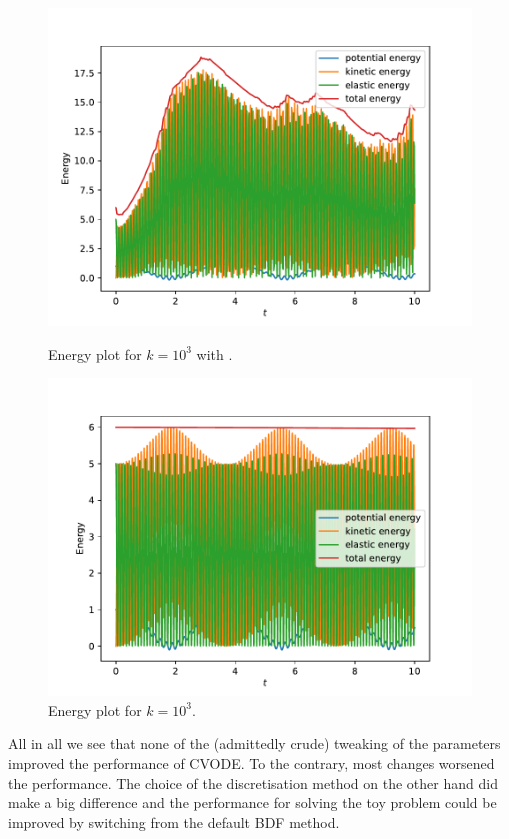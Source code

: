 \documentclass{report}
\begin{document}
\begin{figure}[h]
\centering
\begin{minipage}[b]{0.45\textwidth}
\centering
\includegraphics[width=\textwidth]{../Plots/Task4/Figure_450}
\caption{Energy plot for $k=10^3$ with .}
\label{pl:energy2}
\end{minipage}
\hfill
\begin{minipage}[b]{0.45\textwidth}
\centering
\includegraphics[width=\textwidth]{../Plots/Task4/Figure_451}
\caption{Energy plot for $k=10^3$.}
\label{pl:energy3}
\end{minipage}
\end{figure}

All in all we see that none of the (admittedly crude) tweaking of the parameters improved the performance of CVODE. To the contrary, most changes worsened the performance. The choice of the discretisation method on the other hand did make a big difference and the performance for solving the toy problem could be improved by switching from the default BDF method.
\end{document}
